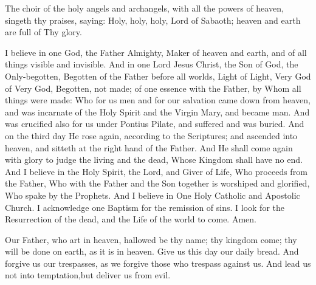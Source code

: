 \documentclass[twoside, letterpaper, 12pt]{report}
\begin{document}
The choir of the holy angels and archangels, with all the powers of heaven, singeth thy praises, saying: Holy, holy, holy, Lord of Sabaoth; heaven and earth are full of Thy glory.

\emph{\nowandever}



I believe in one God, the Father Almighty, Maker of heaven and earth,
and of all things visible and invisible.
And in one Lord Jesus Christ, the Son of God, the Only-begotten,
Begotten of the Father before all worlds, Light of Light, Very God of Very God,
Begotten, not made; of one essence with the Father, by Whom all things were made:
Who for us men and for our salvation came down from heaven,
and was incarnate of the Holy Spirit and the Virgin Mary, and became man.
And was crucified also for us under Pontius Pilate, and suffered and was buried.
And on the third day He rose again, according to the Scriptures; and ascended into
heaven, and sitteth at the right hand of the Father.
And He shall come again with glory to judge the living and the dead,
Whose Kingdom shall have no end.
And I believe in the Holy Spirit, the Lord, and Giver of Life,
Who proceeds from the Father,
Who with the Father and the Son together is worshiped and glorified,
Who spake by the Prophets.
And I believe in One Holy Catholic and Apostolic Church.
I acknowledge one Baptism for the remission of sins.
I look for the Resurrection of the dead, and the Life of the world to come.
Amen.





Our Father, who art in heaven, hallowed be thy name; thy kingdom come;
thy will be done on earth, as it is in heaven. Give us this day our daily bread.
And forgive us our trespasses, as we forgive those who trespass against us.
And lead us not into temptation,but deliver us from evil.



\end{document}
